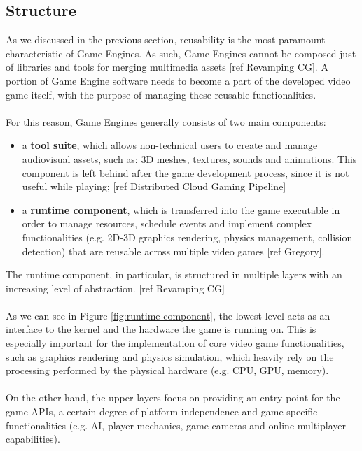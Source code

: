 \subsection{Structure}
As we discussed in the previous section, reusability is the most paramount characteristic of Game Engines. As such, Game Engines cannot be composed just of libraries and tools for merging multimedia assets [ref Revamping CG]. A portion of Game Engine software needs to become a part of the developed video game itself, with the purpose of managing these reusable functionalities. \\ \\
For this reason, Game Engines generally consists of two main components:
\begin{itemize}
	\item a \textbf{tool suite}, which allows non-technical users to create and manage audiovisual assets, such as: 3D meshes, textures, sounds and animations. This component is left behind after the game development process, since it is not useful while playing; [ref Distributed Cloud Gaming Pipeline]
	\item a \textbf{runtime component}, which is transferred into the game executable in order to manage resources, schedule events and implement complex functionalities (e.g. 2D-3D graphics rendering, physics management, collision detection) that are reusable across multiple video games [ref Gregory].
\end{itemize}
The runtime component, in particular, is structured in multiple layers with an increasing level of abstraction. [ref Revamping CG] \\ \\
As we can see in Figure \ref{fig:runtime-component}, the lowest level acts as an interface to the kernel and the hardware the game is running on. This is especially important for the implementation of core video game functionalities, such as graphics rendering and physics simulation, which heavily rely on the processing performed by the physical hardware (e.g. CPU, GPU, memory). \\ \\
On the other hand, the upper layers focus on providing an entry point for the game APIs, a certain degree of platform independence and game specific functionalities (e.g. AI, player mechanics, game cameras and online multiplayer capabilities).
